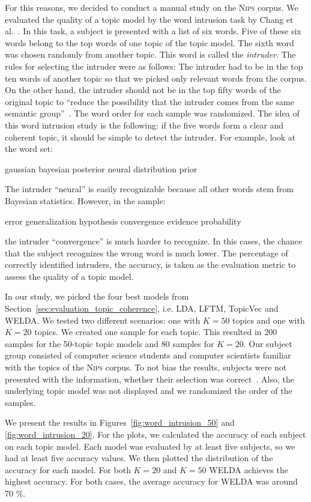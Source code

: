 \documentclass[
        a4paper,
        titlepage,
        twoside,
        parskip,
        numbers=noenddot
        ]{scrbook}
\newcommand{\topicbox}[1]{
  \setlength{\OuterFrameSep}{0pt}
  \begin{framed}
    #1
  \end{framed}
}
\theoremstyle{break}
\begin{document}
For this reasons, we decided to conduct a manual study on the \textsc{Nips} corpus.
We evaluated the quality of a topic model by the word intrusion task by Chang et al.~\cite{Chang2009}.
In this task, a subject is presented with a list of six words.
Five of these six words belong to the top words of one topic of the topic model.
The sixth word was chosen randomly from another topic.
This word is called the \emph{intruder}.
The rules for selecting the intruder were as follows:
The intruder had to be in the top ten words of another topic so that we picked only relevant words from the corpus.
On the other hand, the intruder should not be in the top fifty words of the original topic to ``reduce the possibility that the intruder comes from the same semantic group''~\cite{Chang2009}.
The word order for each sample was randomized.
The idea of this word intrusion study is the following: if the five words form a clear and coherent topic, it should be simple to detect the intruder.
For example, look at the word set:
\topicbox{gaussian bayesian posterior neural distribution prior}
The intruder ``neural'' is easily recognizable because all other words stem from Bayesian statistics.
However, in the sample:
\topicbox{error generalization hypothesis convergence evidence probability}
the intruder ``convergence'' is much harder to recognize.
In this cases, the chance that the subject recognizes the wrong word is much lower.
The percentage of correctly identified intruders, the accuracy, is taken as the evaluation metric to assess the quality of a topic model.

In our study, we picked the four best models from Section~\ref{sec:evaluation_topic_coherence}, i.e. LDA, LFTM, TopicVec and WELDA.
We tested two different scenarios: one with $K = 50$ topics and one with $K = 20$ topics.
We created one sample for each topic.
This resulted in 200 samples for the 50-topic topic models and 80 samples for $K = 20$.
Our subject group consisted of computer science students and computer scientists familiar with the topics of the \textsc{Nips} corpus.
To not bias the results, subjects were not presented with the information, whether their selection was correct~\cite{Chang2009}.
Also, the underlying topic model was not displayed and we randomized the order of the samples.

We present the results in Figures~\ref{fig:word_intrusion_50} and \ref{fig:word_intrusion_20}.
For the plots, we calculated the accuracy of each subject on each topic model.
Each model was evaluated by at least five subjects, so we had at least five accuracy values.
We then plotted the distribution of the accuracy for each model.
For both $K = 20$ and $K = 50$ WELDA achieves the highest accuracy.
For both cases, the average accuracy for WELDA was around 70 \%.
\end{document}
